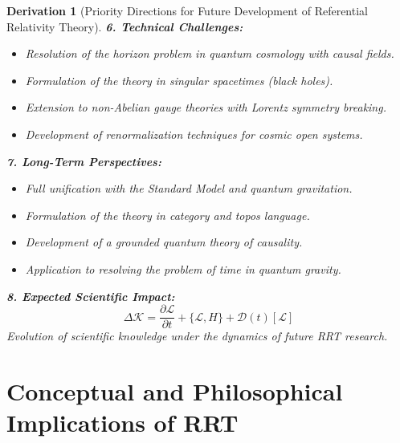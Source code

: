 \documentclass[10pt, a4paper]{article}
\newtheorem{derivation}{Derivation}
\begin{document}
\begin{derivation}[Priority Directions for Future Development of Referential Relativity Theory]
\textbf{6. Technical Challenges:}
\begin{itemize}
\item Resolution of the horizon problem in quantum cosmology with causal fields.
\item Formulation of the theory in singular spacetimes (black holes).
\item Extension to non-Abelian gauge theories with Lorentz symmetry breaking.
\item Development of renormalization techniques for cosmic open systems.
\end{itemize}

\textbf{7. Long-Term Perspectives:}
\begin{itemize}
\item Full unification with the Standard Model and quantum gravitation.
\item Formulation of the theory in category and topos language.
\item Development of a grounded quantum theory of causality.
\item Application to resolving the problem of time in quantum gravity.
\end{itemize}

\textbf{8. Expected Scientific Impact:}
\begin{equation}
\Delta \mathcal{K} = \frac{\partial \mathcal{L}}{\partial t} + \{\mathcal{L}, H\} + \mathcal{D}(t)[\mathcal{L}]
\tag{44.2}
\end{equation}
Evolution of scientific knowledge under the dynamics of future RRT research.
\end{derivation}

\section{Conceptual and Philosophical Implications of RRT}
\end{document}
